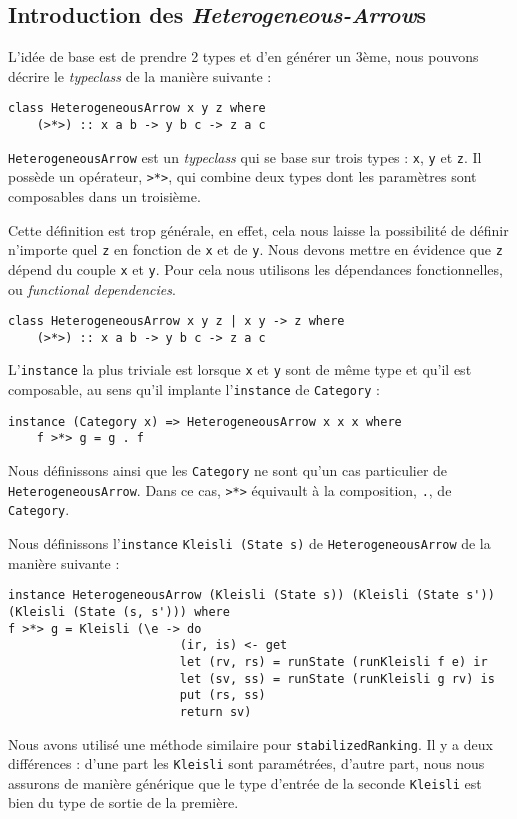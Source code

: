\documentclass{llncs}
\newcommand{\SAs}{\emph{Heterogeneous-Arrow}s }
\newcommand{\HA}{\lstinline{HeterogeneousArrow} }
\newcommand{\HAp}{\lstinline{HeterogeneousArrow}. }
\begin{document}
\subsection{Introduction des \SAs}
L'idée de base est de prendre 2 types et d'en générer un 3ème, nous pouvons
décrire le \emph{typeclass} de la manière suivante :
\begin{lstlisting}
class HeterogeneousArrow x y z where
    (>*>) :: x a b -> y b c -> z a c
\end{lstlisting}
\HA est un \emph{typeclass} qui se base sur trois types : \lstinline{x},
\lstinline{y} et \lstinline{z}.
Il possède un opérateur, \lstinline{>*>}, qui combine deux types dont les
paramètres sont composables dans un troisième.

Cette définition est trop générale, en effet, cela nous laisse la possibilité de
définir n'importe quel \lstinline{z} en fonction de \lstinline{x} et de \lstinline{y}.
Nous devons mettre en évidence que \lstinline{z} dépend du couple \lstinline{x} et \lstinline{y}.
Pour cela nous utilisons les dépendances fonctionnelles, ou \emph{functional dependencies}.
\begin{lstlisting}
class HeterogeneousArrow x y z | x y -> z where
    (>*>) :: x a b -> y b c -> z a c
\end{lstlisting}

L'\lstinline{instance} la plus triviale est lorsque \lstinline{x} et \lstinline{y}
sont de même type et qu'il est composable, au sens qu'il implante l'\lstinline{instance}
de \lstinline{Category} :
\begin{lstlisting}
instance (Category x) => HeterogeneousArrow x x x where
    f >*> g = g . f
\end{lstlisting}
Nous définissons ainsi que les \lstinline{Category} ne sont qu'un cas particulier
de \HAp
Dans ce cas, \lstinline{>*>} équivault à la composition, \lstinline{.}, de
\lstinline{Category}.

Nous définissons l'\lstinline{instance} \lstinline{Kleisli (State s)} de \HA de 
la manière suivante :
\begin{lstlisting}
instance HeterogeneousArrow (Kleisli (State s)) (Kleisli (State s')) (Kleisli (State (s, s'))) where
f >*> g = Kleisli (\e -> do
                        (ir, is) <- get
                        let (rv, rs) = runState (runKleisli f e) ir
                        let (sv, ss) = runState (runKleisli g rv) is
                        put (rs, ss)
                        return sv)
\end{lstlisting}
Nous avons utilisé une méthode similaire pour \lstinline{stabilizedRanking}.
Il y a deux différences : d'une part les \lstinline{Kleisli} sont paramétrées,
d'autre part, nous nous assurons de manière générique que le type d'entrée de la
seconde \lstinline{Kleisli} est bien du type de sortie de la première.
\end{document}
